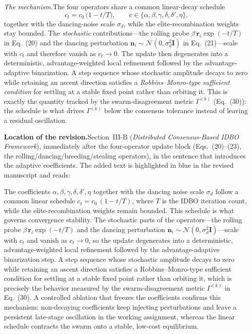 \documentclass[11pt]{article}
\newcommand{\loc}{\medskip\noindent\textbf{Location of the revision.}\quad}
\begin{document}
\medskip
\noindent\emph{The mechanism.}\quad The four operators share a common linear-decay
schedule
\[
  c_t = c_0\,\bigl(1 - t/T\bigr),\qquad
  c \in \{\alpha,\beta,\gamma,\delta,\delta',\eta\},
\]
together with the dancing-noise scale $\sigma_d$, while the elite-recombination
weights stay bounded. The \emph{stochastic} contributions---the rolling probe
$\beta\,\mathbf{r}_i\exp(-t/T)$ in Eq.~(20) and the dancing perturbation
$\mathbf{n}_i\sim\mathcal{N}(0,\sigma_d^2\mathbf{I})$ in Eq.~(21)---scale with
$c_t$ and therefore vanish as $c_t\!\to\!0$. The update then degenerates into a
deterministic, advantage-weighted local refinement followed by the
advantage-adaptive binarization. A step sequence whose stochastic amplitude
decays to zero while retaining an ascent direction satisfies a
\emph{Robbins--Monro-type sufficient condition} for settling at a stable fixed
point rather than orbiting it. This is exactly the quantity tracked by the
swarm-disagreement metric $\Gamma^{(k)}$ (Eq.~(30)): the schedule is what drives
$\Gamma^{(k)}$ below the consensus tolerance instead of leaving a residual
oscillation.

\loc Section~III-B (\emph{Distributed Consensus-Based IDBO Framework}),
immediately after the four-operator update block (Eqs.~(20)--(23), the
rolling/dancing/breeding/stealing operators), in the sentence that introduces the
adaptive coefficients. The added text is highlighted in blue in the revised
manuscript and reads:

\begin{manuscripttext}
The coefficients $\alpha,\beta,\gamma,\delta,\delta',\eta$ together with the
dancing noise scale $\sigma_d$ follow a common linear schedule $c_t=c_0\,(1-t/T)$,
where $T$ is the IDBO iteration count, while the elite-recombination weights remain
bounded. This schedule is what governs convergence stability. The stochastic parts
of the operators---the rolling probe $\beta\,\mathbf{r}_i\exp(-t/T)$ and the dancing
perturbation $\mathbf{n}_i\sim\mathcal{N}(0,\sigma_d^2\mathbf{I})$---scale with
$c_t$ and vanish as $c_t\!\to\!0$, so the update degenerates into a deterministic,
advantage-weighted local refinement followed by the advantage-adaptive
binarization step. A step sequence whose stochastic amplitude decays to zero while
retaining an ascent direction satisfies a Robbins--Monro-type sufficient condition
for settling at a stable fixed point rather than orbiting it, which is precisely
the behavior measured by the swarm-disagreement metric $\Gamma^{(k)}$ in
Eq.~(30). A controlled ablation that freezes the coefficients confirms this
mechanism: non-decaying coefficients keep injecting perturbations and leave a
persistent late-stage oscillation in the working assignment, whereas the linear
schedule contracts the swarm onto a stable, low-cost equilibrium.
\end{manuscripttext}
\end{document}
